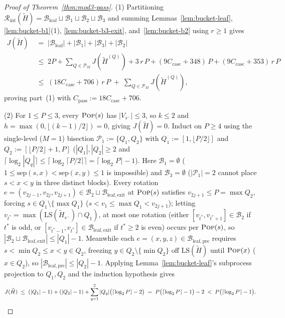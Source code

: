 \documentclass[11pt]{article}
\theoremstyle{definition}
\theoremstyle{remark}
\newcommand{\LS}{\mathrm{LS}}
\newcommand{\sep}{\mathrm{sep}}
\newcommand{\POP}{\textnormal{\scshape Pop}}
\begin{document}
\begin{proof}[Proof of Theorem~\ref{thm:mod3-pass}]
(1) Partitioning $\mathcal{R}_{\mathrm{int}}(\widetilde{H}) = \mathcal{B}_{\mathrm{leaf}} \sqcup \mathcal{B}_1 \sqcup \mathcal{B}_2 \sqcup \mathcal{B}_3$ and summing Lemmas~\ref{lem:bucket-leaf}, \ref{lem:bucket-b1}(1), \ref{lem:bucket-b3-exit}, and~\ref{lem:bucket-b2} using $r \ge 1$ gives
\begin{align*}
J(\widetilde{H})
&\;=\; |\mathcal{B}_{\mathrm{leaf}}| + |\mathcal{B}_1| + |\mathcal{B}_3| + |\mathcal{B}_2|\\
&\;\le\; 2P + \sum_{Q \in \mathcal{P}_M} J(\widetilde{H}^{(Q)}) + 3\,r\,P + (9 C_{\mathrm{casc}} + 348)\,P + (9 C_{\mathrm{casc}} + 353)\,r\,P\\
&\;\le\; (18 C_{\mathrm{casc}} + 706)\,r\,P \;+\; \sum_{Q \in \mathcal{P}_M} J(\widetilde{H}^{(Q)}),
\end{align*}
proving part~(1) with $C_{\mathrm{pass}} := 18 C_{\mathrm{casc}} + 706$.

(2) For $1 \le P \le 3$, every $\POP(s)$ has $|V_{s^-}| \le 3$, so $k \le 2$ and $h = \max(0, \lfloor (k - 1)/2 \rfloor) = 0$, giving $J(\widetilde{H}) = 0$. Induct on $P \ge 4$ using the single-level ($M = 1$) bisection $\mathcal{P}_1 := \{Q_1, Q_2\}$ with $Q_1 := [1, \lfloor P/2 \rfloor]$ and $Q_2 := [\lfloor P/2 \rfloor + 1, P]$ ($|Q_1|, |Q_2| \ge 2$ and $\lceil \log_2 |Q_q| \rceil \le \lceil \log_2 \lceil P/2 \rceil \rceil = \lceil \log_2 P \rceil - 1$). Here $\mathcal{B}_1 = \emptyset$ ($1 \le \sep(s, x) < \sep(x, y) \le 1$ is impossible) and $\mathcal{B}_3 = \emptyset$ ($|\mathcal{P}_1| = 2$ cannot place $s < x < y$ in three distinct blocks). Every rotation $e = (v_{2j-1}, v_{2j}, v_{2j+1}) \in \mathcal{B}_2 \sqcup \mathcal{B}_{\mathrm{leaf,exit}}$ at $\POP(s)$ satisfies $v_{2j+1} \le P = \max Q_2$, forcing $s \in Q_1 \setminus \{\max Q_1\}$ ($s < v_1 \le \max Q_1 < v_{2j+1}$); letting $v_{t^*} = \max(\LS(\widetilde{H}_{s^-}) \cap Q_1)$, at most one rotation (either $[v_{t^*}, v_{t^*+1}] \in \mathcal{B}_2$ if $t^*$ is odd, or $[v_{t^*-1}, v_{t^*}] \in \mathcal{B}_{\mathrm{leaf,exit}}$ if $t^* \ge 2$ is even) occurs per $\POP(s)$, so $|\mathcal{B}_2 \sqcup \mathcal{B}_{\mathrm{leaf,exit}}| \le |Q_1| - 1$. Meanwhile each $e = (x, y, z) \in \mathcal{B}_{\mathrm{leaf,pre}}$ requires $s < \min Q_2 \le x < y \in Q_2$, freezing $y \in Q_2 \setminus \{\min Q_2\}$ off $\LS(\widetilde{H})$ until $\POP(x)$ ($x \in Q_2$), so $|\mathcal{B}_{\mathrm{leaf,pre}}| \le |Q_2| - 1$. Applying Lemma~\ref{lem:bucket-leaf}'s subprocess projection to $Q_1, Q_2$ and the induction hypothesis gives
\[
J(\widetilde{H}) \;\le\; (|Q_1| - 1) + (|Q_2| - 1) + \sum_{q=1}^2 |Q_q|\big(\lceil \log_2 P \rceil - 2\big) \;=\; P\big(\lceil \log_2 P \rceil - 1\big) - 2 \;<\; P\big(\lceil \log_2 P \rceil - 1\big). \qedhere
\]
\end{proof}
\end{document}
